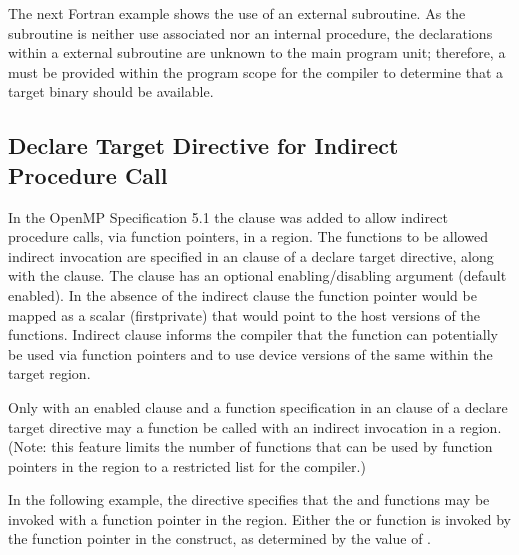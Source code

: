 
The next Fortran example shows the use of an external subroutine. As the subroutine
is neither use associated nor an internal procedure, the 
declarations within a external subroutine are unknown to the main program unit; 
therefore, a  must be provided within the program
scope for the compiler to determine that a target binary should be available.


\subsection{Declare Target Directive for Indirect Procedure Call}
\label{subsec:indirect}


In the OpenMP Specification 5.1 the  clause was added to allow
indirect procedure calls, via function pointers, in a  region.
The functions to be allowed indirect invocation are specified in an  
clause of a declare target directive, along with the  clause.
The clause has an optional enabling/disabling argument (default enabled). In the 
absence of the indirect clause the function pointer would be mapped as a scalar 
(firstprivate) that would point to the host versions of the functions. 
Indirect clause informs the compiler that the function can potentially be 
used via function pointers and to use device versions of the same within 
the target region.

Only with an enabled  clause and a function specification in an  clause
of a declare target directive may a function be called with an indirect invocation in a  region.
(Note: this feature limits the number of functions that can be used by function 
pointers in the  region to a restricted list for the compiler.)

In the following example, the  
 directive specifies that the  and  functions may 
be invoked with a function pointer in the  region.
Either the  or  function is invoked by the  function 
pointer in the  construct, as determined by the value of .

